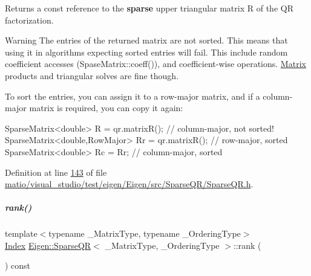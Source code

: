 \begin{DoxyReturn}{Returns}
a const reference to the {\bfseries sparse} upper triangular matrix R of the QR factorization. 
\end{DoxyReturn}
\begin{DoxyWarning}{Warning}
The entries of the returned matrix are not sorted. This means that using it in algorithms expecting sorted entries will fail. This include random coefficient accesses (Spase\+Matrix\+::coeff()), and coefficient-\/wise operations. \hyperlink{group___core___module_class_eigen_1_1_matrix}{Matrix} products and triangular solves are fine though.
\end{DoxyWarning}
To sort the entries, you can assign it to a row-\/major matrix, and if a column-\/major matrix is required, you can copy it again\+: 
\begin{DoxyCode}
SparseMatrix<double>          R  = qr.matrixR();  \textcolor{comment}{// column-major, not sorted!}
SparseMatrix<double,RowMajor> Rr = qr.matrixR();  \textcolor{comment}{// row-major, sorted}
SparseMatrix<double>          Rc = Rr;            \textcolor{comment}{// column-major, sorted}
\end{DoxyCode}
 

Definition at line \hyperlink{matio_2visual__studio_2test_2eigen_2_eigen_2src_2_sparse_q_r_2_sparse_q_r_8h_source_l00143}{143} of file \hyperlink{matio_2visual__studio_2test_2eigen_2_eigen_2src_2_sparse_q_r_2_sparse_q_r_8h_source}{matio/visual\+\_\+studio/test/eigen/\+Eigen/src/\+Sparse\+Q\+R/\+Sparse\+Q\+R.\+h}.

\mbox{\label{group___sparse_q_r___module_a70ec2b9e5cb62a41dc1ee2adfb54e9b0}} 
\subparagraph{\texorpdfstring{rank()}{rank()}\hspace{0.1cm}{\footnotesize\ttfamily [1/2]}}
{\footnotesize\ttfamily template$<$typename \+\_\+\+Matrix\+Type, typename \+\_\+\+Ordering\+Type$>$ \\
\hyperlink{namespace_eigen_a62e77e0933482dafde8fe197d9a2cfde}{Index} \hyperlink{group___sparse_q_r___module_class_eigen_1_1_sparse_q_r}{Eigen\+::\+Sparse\+QR}$<$ \+\_\+\+Matrix\+Type, \+\_\+\+Ordering\+Type $>$\+::rank (\begin{DoxyParamCaption}{ }\end{DoxyParamCaption}) const\hspace{0.3cm}{\ttfamily [inline]}}

